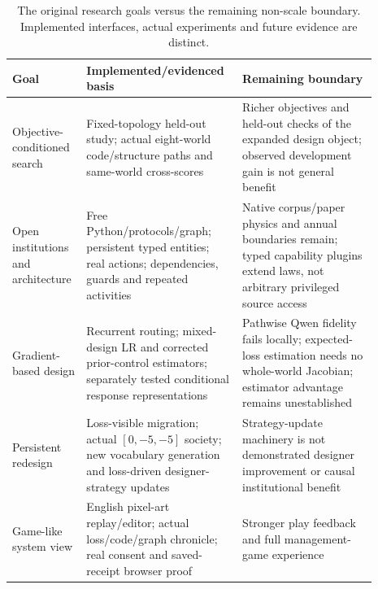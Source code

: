 \documentclass{article}
\begin{document}
\begin{table}[ht]
\caption{The original research goals versus the remaining non-scale boundary.
Implemented interfaces, actual experiments and future evidence are distinct.}
\label{tab:program-boundaries}
\centering\small
\begin{tabular}{>{\raggedright\arraybackslash}p{0.19\linewidth}>{\raggedright\arraybackslash}p{0.35\linewidth}>{\raggedright\arraybackslash}p{0.35\linewidth}}
\toprule
Goal & Implemented/evidenced basis & Remaining boundary \\
\midrule
Objective-conditioned search & Fixed-topology held-out study; actual eight-world code/structure paths and same-world cross-scores & Richer objectives and held-out checks of the expanded design object; observed development gain is not general benefit \\
\addlinespace[4pt]
Open institutions and architecture & Free Python/protocols/graph; persistent typed entities; real actions; dependencies, guards and repeated activities & Native corpus/paper physics and annual boundaries remain; typed capability plugins extend laws, not arbitrary privileged source access \\
\addlinespace[4pt]
Gradient-based design & Recurrent routing; mixed-design LR and corrected prior-control estimators; separately tested conditional response representations & Pathwise Qwen fidelity fails locally; expected-loss estimation needs no whole-world Jacobian; estimator advantage remains unestablished \\
\addlinespace[4pt]
Persistent redesign & Loss-visible migration; actual $[0,-5,-5]$ society; new vocabulary generation and loss-driven designer-strategy updates & Strategy-update machinery is not demonstrated designer improvement or causal institutional benefit \\
\addlinespace[4pt]
Game-like system view & English pixel-art replay/editor; actual loss/code/graph chronicle; real consent and saved-receipt browser proof & Stronger play feedback and full management-game experience \\
\bottomrule
\end{tabular}
\end{table}
\end{document}
